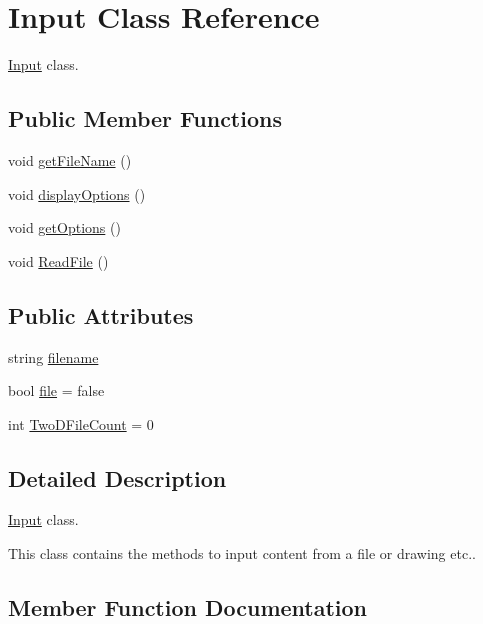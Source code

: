 \hypertarget{classInput}{}\section{Input Class Reference}
\label{classInput}


\hyperlink{classInput}{Input} class.  


\subsection*{Public Member Functions}
\begin{DoxyCompactItemize}
\item 
void \hyperlink{classInput_abb4311267ded94768e6df9cb88b179bb}{get\+File\+Name} ()
\item 
void \hyperlink{classInput_a29639b68a8a421e0cb1b576eae3f8259}{display\+Options} ()
\item 
void \hyperlink{classInput_af0a5bad322752da31bcd7b1e2d99d611}{get\+Options} ()
\item 
void \hyperlink{classInput_a9d9395f68b01faa00f962791878723a2}{Read\+File} ()
\end{DoxyCompactItemize}
\subsection*{Public Attributes}
\begin{DoxyCompactItemize}
\item 
string \hyperlink{classInput_af296359065236ac9139aab7736d6844d}{filename}
\item 
bool \hyperlink{classInput_ad073fa115ead2e8b7492214215ebd22d}{file} = false
\item 
int \hyperlink{classInput_a82141fe9142aec447f9ef52fd2f78c73}{Two\+D\+File\+Count} = 0
\end{DoxyCompactItemize}


\subsection{Detailed Description}
\hyperlink{classInput}{Input} class. 

This class contains the methods to input content from a file or drawing etc.. 

\subsection{Member Function Documentation}
